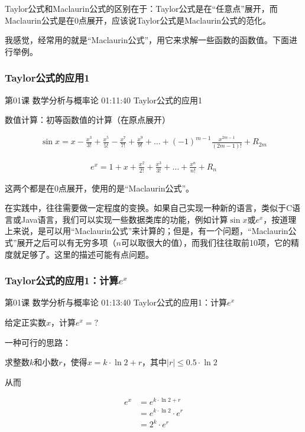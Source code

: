 \documentclass[UTF8]{ctexbook}
\begin{document}
Taylor公式和Maclaurin公式的区别在于：Taylor公式是在“任意点”展开，而Maclaurin公式是在$0$点展开，应该说Taylor公式是Maclaurin公式的范化。

我感觉，经常用的就是“Maclaurin公式”，用它来求解一些函数的函数值。下面进行举例。

\subsubsection{Taylor公式的应用1}

第01课 数学分析与概率论 01:11:40 Taylor公式的应用1

数值计算：初等函数值的计算（在原点展开）

\begin{equation}
\begin{aligned}
\sin x = x - \frac{x^{3}}{3!} + \frac{x^{5}}{5!}  - \frac{x^{7}}{7!} + \frac{x^{9}}{9!} + \dots
+ (-1)^{m-1} \frac{x^{2m-1}}{(2m-1)!} + R_{2m}
\end{aligned}
\end{equation}

\begin{equation}
\begin{aligned}
e^{x} = 1 + x + \frac{x^{2}}{2!} +  \frac{x^{3}}{3!} + \dots +  \frac{x^{n}}{n!} + R_{n}
\end{aligned}
\end{equation}

这两个都是在$0$点展开，使用的是“Maclaurin公式”。

在实践中，往往需要做一定程度的变换。如果自己实现一种新的语言，类似于C语言或Java语言，我们可以实现一些数据类库的功能，例如计算$\sin x$或$e^{x}$，按道理上来说，是可以用“Maclaurin公式”来计算的；但是，有一个问题，“Maclaurin公式”展开之后可以有无穷多项（$n$可以取很大的值），而我们往往取前10项，它的精度就足够了。这里的描述可能有点问题。

\subsubsection{Taylor公式的应用1：计算$e^{x}$}

第01课 数学分析与概率论 01:13:40 Taylor公式的应用1：计算$e^{x}$

给定正实数$x$，计算$e^{x}=?$

一种可行的思路：

求整数$k$和小数$r$，使得$x=k \cdot \ln 2 + r$，其中$|r| \leq 0.5 \cdot \ln 2$

从而

\begin{equation}
\begin{aligned}
e^{x} &= e^{k \cdot \ln 2 + r} \\
&=e^{k \cdot \ln 2} \cdot e^{r} \\
&=2^{k} \cdot e^{r}
\end{aligned}
\end{equation}
\end{document}
